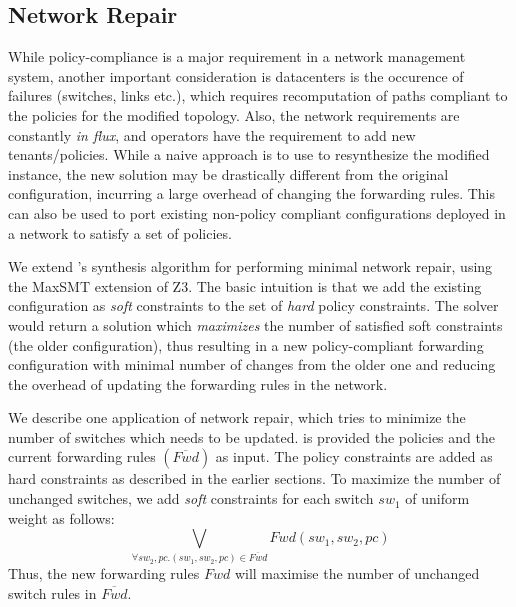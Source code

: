 \subsection{Network Repair}
While policy-compliance is a major requirement in a network management system,
another important consideration is datacenters is the occurence of failures (switches, links etc.),
which requires recomputation of paths compliant to the policies for the modified topology. 
Also, the network requirements are constantly \emph{in flux}, and operators have the requirement to 
add new tenants/policies. While a naive approach is to use \name to resynthesize the modified instance,
the new solution may be drastically different from the original configuration, incurring a
large overhead of changing the forwarding rules. This can also be used to
port existing non-policy compliant configurations deployed in a network to
satisfy a set of policies.

We extend \name's synthesis algorithm for performing
minimal network repair, using the MaxSMT extension of Z3. The basic intuition is that
we add the existing configuration as \emph{soft} constraints to the set of \emph{hard} 
policy constraints. The solver would return a solution which \emph{maximizes} the 
number of satisfied soft constraints (the older configuration),
thus resulting in a new policy-compliant forwarding 
configuration with minimal 
number of changes from the older one and reducing the overhead of
updating the forwarding rules in the network.  

We describe one application of network repair, which tries to minimize
the number of switches which needs to be updated. \name is provided the policies
and the current forwarding rules $(\overline{Fwd})$ as input. The policy constraints are added as hard
constraints as described in the earlier sections. To maximize the number of unchanged
switches, we add \emph{soft} constraints for each switch $sw_1$ of uniform weight as follows:
\begin{equation}
\bigvee_{\forall sw_2, pc. (sw_1, sw_2, pc) \in \overline{Fwd} } Fwd(sw_1, sw_2, pc)
\end{equation}
Thus, the new forwarding rules $Fwd$ will maximise the number of unchanged
switch rules in $\overline{Fwd}$.


 







 